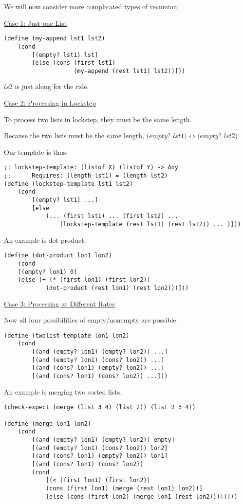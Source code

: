 \documentclass{article}
\begin{document}
We will now consider more complicated types of recursion

\underline{Case 1: Just one List}

\begin{lstlisting}
(define (my-append lst1 lst2)
    (cond
        [(empty? lst1) lst]
        [else (cons (first lst1)
                    (my-append (rest lst1) lst2))]))
\end{lstlisting}

$ls2$ is just along for the ride. 


\underline{Case 2: Processing in Lockstep}

To process two lists in lockstep, they must be the same length. 

Because the two lists must be the same length, $(empty?$ $lst1) \iff (empty?$ $lst2)$

Our template is thus,
\begin{lstlisting}
;; lockstep-template: (listof X) (listof Y) -> Any
;;      Requires: (length lst1) = (length lst2)
(define (lockstep-template lst1 lst2)
    (cond
        [(empty? lst1) ...]
        [else 
            (... (first lst1) ... (first lst2) ...
                (lockstep-template (rest lst1) (rest lst2)) ... )]))
\end{lstlisting}

An example is dot product. 

\begin{lstlisting}
(define (dot-product lon1 lon2)
    (cond
    [(empty? lon1) 0]
    [else (+ (* (first lon1) (first lon2))
            (dot-product (rest lon1) (rest lon2)))]))
\end{lstlisting}


\underline{Case 3: Processing at Different Rates}

Now all four possibilities of empty/nonempty are possible. 

\begin{lstlisting}
(define (twolist-template lon1 lon2)
    (cond
        [(and (empty? lon1) (empty? lon2)) ...]
        [(and (empty? lon1) (cons? lon2)) ...]
        [(and (cons? lon1) (empty? lon2)) ...]
        [(and (cons? lon1) (cons? lon2)) ...]))
\end{lstlisting}

An example is merging two sorted lists. 

\begin{lstlisting}
(check-expect (merge (list 3 4) (list 2)) (list 2 3 4))

(define (merge lon1 lon2)
    (cond
        [(and (empty? lon1) (empty? lon2)) empty]
        [(and (empty? lon1) (cons? lon2)) lon2]
        [(and (cons? lon1) (empty? lon2)) lon1]
        [(and (cons? lon1) (cons? lon2))
        (cond
            [(< (first lon1) (first lon2))
            (cons (first lon1) (merge (rest lon1) lon2))]
            [else (cons (first lon2) (merge lon1 (rest lon2)))])]))
\end{lstlisting}
\end{document}
